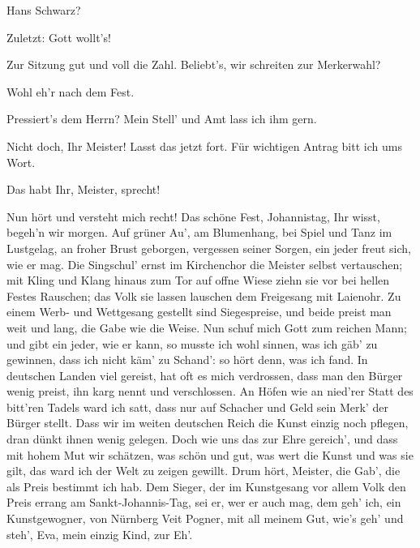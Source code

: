 \begin{drama}


\Kothnerspeaks
Hans Schwarz?

\Schwarzspeaks
Zuletzt:
Gott wollt's!


\Kothnerspeaks
Zur Sitzung gut und voll die Zahl.
Beliebt's, wir schreiten zur Merkerwahl?

\Vogelgesangspeaks
Wohl eh'r nach dem Fest.

\Beckmesserspeaks
Pressiert's dem Herrn?
Mein Stell' und Amt lass ich ihm gern.

\Pognerspeaks
Nicht doch, Ihr Meister! Lasst das jetzt fort.
Für wichtigen Antrag bitt ich ums Wort.


\Kothnerspeaks
Das habt Ihr, Meister, sprecht!

\Pognerspeaks
Nun hört und versteht mich recht!
Das schöne Fest, Johannistag,
Ihr wisst, begeh'n wir morgen.
Auf grüner Au', am Blumenhang,
bei Spiel und Tanz im Lustgelag,
an froher Brust geborgen,
vergessen seiner Sorgen,
ein jeder freut sich, wie er mag.
Die Singschul' ernst im Kirchenchor
die Meister selbst vertauschen;
mit Kling und Klang hinaus zum Tor
auf offne Wiese ziehn sie vor
bei hellen Festes Rauschen;
das Volk sie lassen lauschen
dem Freigesang mit Laienohr.
Zu einem Werb- und Wettgesang
gestellt sind Siegespreise,
und beide preist man weit und lang,
die Gabe wie die Weise.
Nun schuf mich Gott zum reichen Mann;
und gibt ein jeder, wie er kann,
so musste ich wohl sinnen,
was ich gäb' zu gewinnen,
dass ich nicht käm' zu Schand':
so hört denn, was ich fand.
In deutschen Landen viel gereist,
hat oft es mich verdrossen,
dass man den Bürger wenig preist,
ihn karg nennt und verschlossen.
An Höfen wie an nied'rer Statt
des bitt'ren Tadels ward ich satt,
dass nur auf Schacher und Geld
sein Merk' der Bürger stellt.
Dass wir im weiten deutschen Reich
die Kunst einzig noch pflegen,
dran dünkt ihnen wenig gelegen.
Doch wie uns das zur Ehre gereich',
und dass mit hohem Mut
wir schätzen, was schön und gut,
was wert die Kunst und was sie gilt,
das ward ich der Welt zu zeigen gewillt.
Drum hört, Meister, die Gab',
die als Preis bestimmt ich hab.
Dem Sieger, der im Kunstgesang
vor allem Volk den Preis errang
am Sankt-Johannis-Tag,
sei er, wer er auch mag,
dem geh' ich, ein Kunstgewogner,
von Nürnberg Veit Pogner,
mit all meinem Gut, wie's geh' und steh',
Eva, mein einzig Kind, zur Eh'.


\end{drama}
